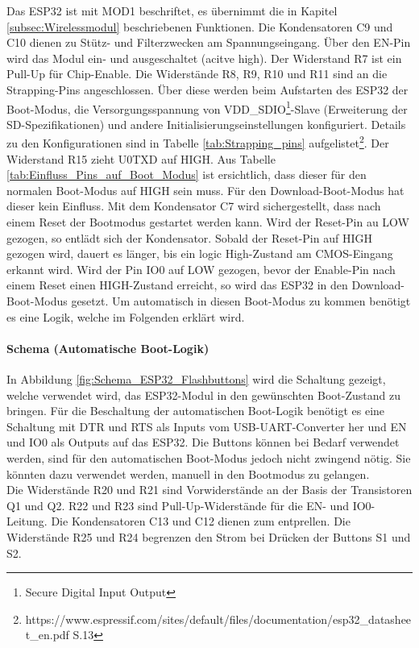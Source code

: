 Das ESP32 ist mit MOD1 beschriftet, es übernimmt die in Kapitel \ref{subsec:Wirelessmodul} beschriebenen Funktionen. Die Kondensatoren C9 und C10 dienen zu Stütz- und Filterzwecken am Spannungseingang.  Über den EN-Pin wird das Modul ein- und ausgeschaltet (acitve high). Der Widerstand R7 ist ein Pull-Up für Chip-Enable. Die Widerstände R8, R9, R10 und R11 sind an die Strapping-Pins angeschlossen. Über diese werden beim Aufstarten des ESP32 der Boot-Modus, die Versorgungsspannung von VDD\_SDIO\footnote{Secure Digital Input Output}-Slave (Erweiterung der SD-Spezifikationen) und andere Initialisierungseinstellungen konfiguriert. Details zu den Konfigurationen sind in Tabelle \ref{tab:Strapping_pins} aufgelistet\footnote{https://www.espressif.com/sites/default/files/documentation/esp32\_datasheet\_en.pdf S.13}. Der Widerstand R15 zieht U0TXD auf HIGH. Aus Tabelle \ref{tab:Einfluss_Pins_auf_Boot_Modus} ist ersichtlich, dass dieser für den normalen Boot-Modus auf HIGH sein muss. Für den Download-Boot-Modus hat dieser kein Einfluss. Mit dem Kondensator C7 wird sichergestellt, dass nach einem Reset der Bootmodus gestartet werden kann. Wird der Reset-Pin au LOW gezogen, so entlädt sich der Kondensator. Sobald der Reset-Pin auf HIGH gezogen wird, dauert es länger, bis ein logic High-Zustand am CMOS-Eingang erkannt wird. Wird der Pin IO0 auf LOW gezogen, bevor der Enable-Pin nach einem Reset einen HIGH-Zustand erreicht, so wird das ESP32 in den Download-Boot-Modus gesetzt. Um automatisch in diesen Boot-Modus zu kommen benötigt es eine Logik, welche im Folgenden erklärt wird.

\paragraph{Schema (Automatische Boot-Logik)}\mbox{}

In Abbildung \ref{fig:Schema_ESP32_Flashbuttons} wird die Schaltung gezeigt, welche verwendet wird, das ESP32-Modul in den gewünschten Boot-Zustand zu bringen. Für die Beschaltung der automatischen Boot-Logik benötigt es eine Schaltung mit DTR und RTS als Inputs vom USB-UART-Converter her und EN und IO0 als Outputs auf das ESP32. Die Buttons können bei Bedarf verwendet werden, sind für den automatischen Boot-Modus jedoch nicht zwingend nötig. Sie könnten dazu verwendet werden, manuell in den Bootmodus zu gelangen.\\
Die Widerstände R20 und R21 sind Vorwiderstände an der Basis der Transistoren Q1 und Q2. R22 und R23 sind Pull-Up-Widerstände für die EN- und IO0-Leitung. Die Kondensatoren C13 und C12 dienen zum entprellen. Die Widerstände R25 und R24 begrenzen den Strom bei Drücken der Buttons S1 und S2.

